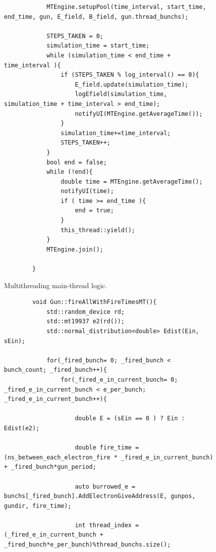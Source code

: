 \documentclass[a4paper,oneside,12pt]{report}
\numberwithin{equation}{chapter}
\begin{document}
{\begin{figure}[H]
\begin{verbatim}
            MTEngine.setupPool(time_interval, start_time, end_time, gun, E_field, B_field, gun.thread_bunchs);
        
            STEPS_TAKEN = 0;
            simulation_time = start_time;
            while (simulation_time < end_time + time_interval ){
                if (STEPS_TAKEN % log_interval() == 0){
                    E_field.update(simulation_time);
                    logEfield(simulation_time, simulation_time + time_interval > end_time);
                    notifyUI(MTEngine.getAverageTime());
                }
                simulation_time+=time_interval;
                STEPS_TAKEN++;
            }
            bool end = false;
            while (!end){
                double time = MTEngine.getAverageTime();
                notifyUI(time);
                if ( time >= end_time ){
                    end = true;
                }
                this_thread::yield();
            }
            MTEngine.join();
            
        }
    \end{verbatim}
    \vspace{0pt}
    \caption{Multithreading main-thread logic.}
    \label{fig:_runMT}
\end{figure}

\vspace{5pt}
\begin{figure}[H]
    \centering
    \begin{verbatim}
        void Gun::fireAllWithFireTimesMT(){
            std::random_device rd;
            std::mt19937 e2(rd());
            std::normal_distribution<double> Edist(Ein, sEin);
    
            for(_fired_bunch= 0; _fired_bunch < bunch_count; _fired_bunch++){
                for(_fired_e_in_current_bunch= 0; _fired_e_in_current_bunch < e_per_bunch; _fired_e_in_current_bunch++){
    
                    double E = (sEin == 0 ) ? Ein : Edist(e2);
    
                    double fire_time = (ns_between_each_electron_fire * _fired_e_in_current_bunch) + _fired_bunch*gun_period;
    
                    auto burrowed_e = bunchs[_fired_bunch].AddElectronGiveAddress(E, gunpos, gundir, fire_time);
    
                    int thread_index = (_fired_e_in_current_bunch + _fired_bunch*e_per_bunch)%thread_bunchs.size();
    

\end{verbatim}
\end{figure}}
\end{document}
